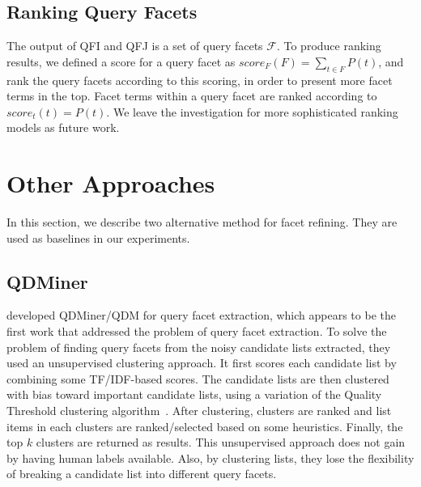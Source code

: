 \subsection{Ranking Query Facets}
The output of QFI and QFJ is a set of query facets $\mathcal{F}$. To produce ranking results, we defined a score for a query facet as $score_F(F)=\sum_{t \in F}{P(t)}$, and rank the query facets according to this scoring, in order to present more facet terms in the top. Facet terms within a query facet are ranked according to $score_t(t)=P(t)$. We leave the investigation for more sophisticated ranking models as future work.

\section{Other Approaches}
\label{sec:facet-other}
In this section, we describe two alternative method for facet refining. They are used as baselines in our experiments. 

\subsection{QDMiner}
\citet{dou2011finding} developed QDMiner/QDM for query facet extraction, which appears to be the first work that addressed the problem of query facet extraction.
To solve the problem of finding query facets from the noisy candidate lists extracted, they used an unsupervised clustering approach.
It first scores each candidate list by combining some TF/IDF-based scores.
The candidate lists are then clustered with bias toward important candidate lists, 
using a variation of the Quality Threshold clustering algorithm~\cite{heyer1999exploring}.
After clustering, clusters are ranked and list items in each clusters are ranked/selected based on some heuristics.
Finally, the top $k$ clusters are returned as results.
This unsupervised approach does not gain by having human labels available.
Also, by clustering lists, they lose the flexibility of breaking a candidate list into different query facets.

